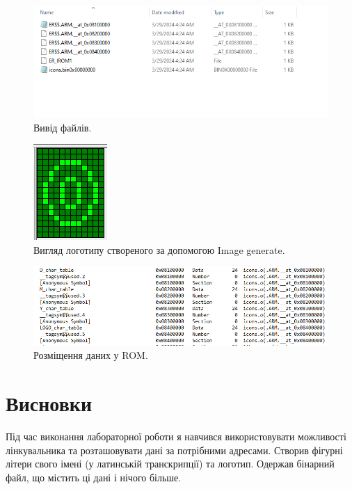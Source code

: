 \documentclass[oneside,14pt]{extarticle}
\begin{document}
\begin{normalsize}
	\begin{figure}[H]
	    \centering
	    \includegraphics[scale=0.7]{1}
	    \caption{Вивід файлів.}
	\end{figure}
	\begin{figure}[H]
	    \centering
	    \includegraphics[scale=0.7]{2}
	    \caption{Вигляд логотипу створеного за допомогою Image generate.}
	\end{figure}
	\begin{figure}[H]
	    \centering
	    \includegraphics[scale=0.5]{3}
	    \caption{Розміщення даних у ROM.}
	\end{figure}
	
	\section*{Висновки}
	Під час виконання лабораторної роботи я навчився використовувати можливості лінкувальника та розташовувати дані за потрібними адресами. Створив фігурні літери свого імені (у латинській транскрипції) та логотип. Одержав бінарний файл, що містить ці дані і нічого більше.
	    
\end{normalsize}
\end{document}
